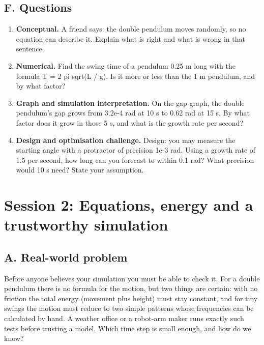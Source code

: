 \documentclass[11pt,a4paper]{article}
\begin{document}
\subsection*{F. Questions}
\begin{enumerate}[nosep]
\item \textbf{Conceptual.} A friend says: the double pendulum moves randomly, so no equation can describe it. Explain what is right and what is wrong in that sentence.
\item \textbf{Numerical.} Find the swing time of a pendulum 0.25 m long with the formula T = 2 pi sqrt(L / g). Is it more or less than the 1 m pendulum, and by what factor?
\item \textbf{Graph and simulation interpretation.} On the gap graph, the double pendulum's gap grows from 3.2e-4 rad at 10 s to 0.62 rad at 15 s. By what factor does it grow in those 5 s, and what is the growth rate per second?
\item \textbf{Design and optimisation challenge.} Design: you may measure the starting angle with a protractor of precision 1e-3 rad. Using a growth rate of 1.5 per second, how long can you forecast to within 0.1 rad? What precision would 10 s need? State your assumption.
\end{enumerate}

\section{Session 2: Equations, energy and a trustworthy simulation}

\subsection*{A. Real-world problem}
Before anyone believes your simulation you must be able to check it. For a double pendulum there is no formula for the motion, but two things are certain: with no friction the total energy (movement plus height) must stay constant, and for tiny swings the motion must reduce to two simple patterns whose frequencies can be calculated by hand. A weather office or a robot-arm maker runs exactly such tests before trusting a model. Which time step is small enough, and how do we know?
\end{document}
